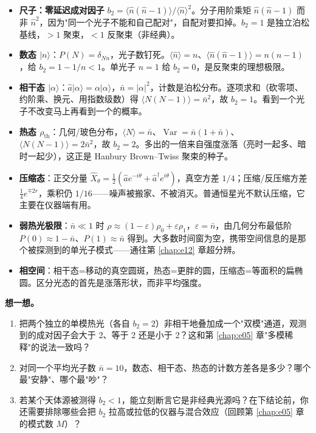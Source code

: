 \begin{itemize}
  \item \textbf{尺子：零延迟成对因子} \(b_2=\langle\hat n(\hat n-1)\rangle/\langle\hat n\rangle^2\)。分子用阶乘矩 \(\hat n(\hat n-1)\) 而非 \(\hat n^2\)，因为"同一个光子不能和自己配对"，自配对要扣掉。\(b_2=1\) 是独立泊松基线，\(>1\) 聚束，\(<1\) 反聚束（非经典）。
  \item \textbf{数态 \(|n\rangle\)}：\(P(N)=\delta_{Nn}\)，光子数钉死。\(\langle\hat n\rangle=n\)、\(\langle\hat n(\hat n-1)\rangle=n(n-1)\)，给 \(b_2=1-1/n<1\)。单光子 \(n=1\) 给 \(b_2=0\)，是反聚束的理想极限。
  \item \textbf{相干态 \(|\alpha\rangle\)}：\(\hat a|\alpha\rangle=\alpha|\alpha\rangle\)，\(\bar n=|\alpha|^2\)，计数是泊松分布。逐项求和（砍零项、约阶乘、换元、用指数级数）得 \(\langle N(N-1)\rangle=\bar n^2\)，故 \(b_2=1\)。看到一个光子不改变马上再看到一个的概率。
  \item \textbf{热态 \(\rho_{\text{th}}\)}：几何/玻色分布，\(\langle N\rangle=\bar n\)、\(\operatorname{Var}=\bar n(1+\bar n)\)、\(\langle N(N-1)\rangle=2\bar n^2\)，故 \(b_2=2\)。多出的一倍来自强度涨落（亮时一起多、暗时一起少），这正是 Hanbury Brown--Twiss 聚束的种子。
  \item \textbf{压缩态}：正交分量 \(\hat X_\theta=\tfrac12(\hat a e^{-i\theta}+\hat a^\dagger e^{i\theta})\)，真空方差 \(1/4\)；压缩/反压缩方差 \(\tfrac14 e^{\mp 2r}\)，乘积仍 \(1/16\)——噪声被搬家、不被消灭。普通恒星光不默认压缩，它主要在仪器端有用。
  \item \textbf{弱热光极限}：\(\bar n\ll1\) 时 \(\rho\approx(1-\varepsilon)\rho_0+\varepsilon\rho_1\)，\(\varepsilon=\bar n\)，由几何分布最低阶 \(P(0)\approx1-\bar n\)、\(P(1)\approx\bar n\) 得到。大多数时间窗为空，携带空间信息的是那个被探测到的单光子模式——通往第 \ref{chap:e12} 章超分辨。
  \item \textbf{相空间}：相干态=移动的真空圆斑，热态=更胖的圆，压缩态=等面积的扁椭圆。区分光态的首先是涨落形状，而非平均强度。
\end{itemize}

\medskip
\noindent\textbf{想一想。}
\begin{enumerate}
  \item 把两个独立的单模热光（各自 \(b_2=2\)）非相干地叠加成一个"双模"通道，观测到的成对因子会大于 2、等于 2 还是小于 2？这和第 \ref{chap:e05} 章"多模稀释"的说法一致吗？
  \item 对同一个平均光子数 \(\bar n=10\)，数态、相干态、热态的计数方差各是多少？哪个最"安静"、哪个最"吵"？
  \item 若某个天体源被测得 \(b_2<1\)，能立刻断言它是非经典光源吗？在下结论前，你还需要排除哪些会把 \(b_2\) 拉高或拉低的仪器与混合效应（回顾第 \ref{chap:e05} 章的模式数 \(M\)）？
\end{enumerate}

